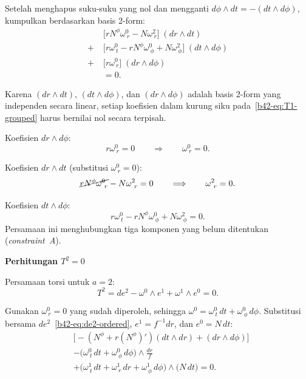 Setelah menghapus suku-suku yang nol dan mengganti $d\phi \wedge dt = -(dt \wedge d\phi)$, kumpulkan berdasarkan basis 2-form:
\begin{align}
    &\Big[rN^\phi\omega^0_{\ r} - N\omega^2_{\ r}\Big]\;(dr \wedge dt) \nonumber\\[6pt]
    +\;&\Big[r\omega^0_{\ t} - rN^\phi\omega^0_{\ \phi} + N\omega^2_{\ \phi}\Big]\;(dt \wedge d\phi) \nonumber\\[6pt]
    +\;&\Big[r\omega^0_{\ r}\Big]\;(dr \wedge d\phi) \nonumber\\[6pt]
    &= 0. \label{b42-eq:T1-grouped}
\end{align}
 
Karena $(dr \wedge dt)$, $(dt \wedge d\phi)$, dan $(dr \wedge d\phi)$ adalah basis 2-form yang independen secara linear, setiap koefisien dalam kurung siku pada~\eqref{b42-eq:T1-grouped} harus bernilai nol secara terpisah.
 
\noindent Koefisien $dr \wedge d\phi$:
\begin{equation}
    r\omega^0_{\ r} = 0 \qquad \Longrightarrow \qquad \omega^0_{\ r} = 0. \label{b42-eq:res-w0r}
\end{equation}
 
\noindent Koefisien $dr \wedge dt$ (substitusi $\omega^0_{\ r} = 0$):
\begin{equation}
    \cancel{rN^\phi\omega^0_{\ r}} - N\omega^2_{\ r} = 0 \qquad \Longrightarrow \qquad \omega^2_{\ r} = 0. \label{b42-eq:res-w2r}
\end{equation}
 
\noindent Koefisien $dt \wedge d\phi$:
\begin{equation}
    r\omega^0_{\ t} - rN^\phi\omega^0_{\ \phi} + N\omega^2_{\ \phi} = 0. \label{b42-eq:constraint-A}
\end{equation}
Persamaan ini menghubungkan tiga komponen yang belum ditentukan (\emph{constraint~A}).
 
\vspace{0.5em}
\noindent \textbf{Perhitungan $T^2 = 0$}

Persamaan torsi untuk $a = 2$:
\begin{equation}
    T^2 = de^2 - \omega^0 \wedge e^1 + \omega^1 \wedge e^0 = 0. \label{b42-eq:T2-start}
\end{equation}
 
Gunakan $\omega^0_{\ r} = 0$ yang sudah diperoleh, sehingga $\omega^0 = \omega^0_{\ t}\,dt + \omega^0_{\ \phi}\,d\phi$. Substitusi bersama $de^2$~\eqref{b42-eq:de2-ordered}, $e^1 = f^{-1}dr$, dan $e^0 = N\,dt$:
\begin{align}
    &\Big[-(N^\phi + r(N^\phi)')(dt \wedge dr) + (dr \wedge d\phi)\Big] \nonumber\\[6pt]
    &- \Big(\omega^0_{\ t}\,dt + \omega^0_{\ \phi}\,d\phi\Big) \wedge \frac{dr}{f} \nonumber\\[6pt]
    &+ \Big(\omega^1_{\ t}\,dt + \omega^1_{\ r}\,dr + \omega^1_{\ \phi}\,d\phi\Big) \wedge \Big(N\,dt\Big) = 0. \label{b42-eq:T2-substituted}
\end{align}
 
